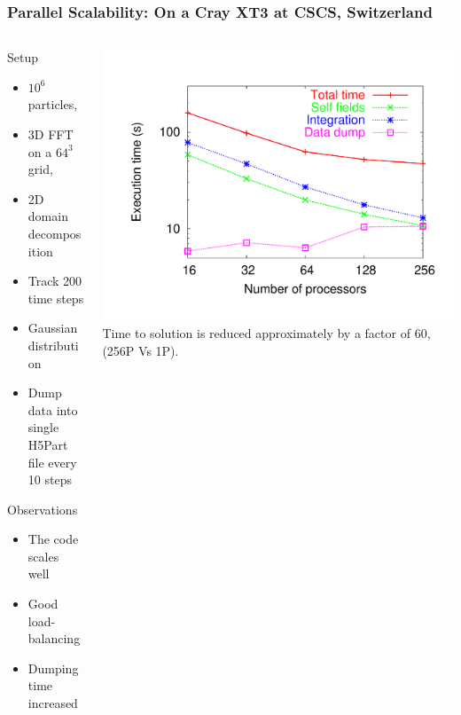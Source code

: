 \documentclass[xcolor=pdftex,table,10pt,yellow,mathserif]{beamer}
\begin{document}
\begin{frame} 
  \frametitle{Parallel Scalability: {On a Cray XT3 at CSCS, Switzerland}}
  \begin{columns}
    \begin{column}{4.cm}
      \scriptsize
      \begin{block}{Setup}
        \begin{itemize}
        \item  \alert{$10^6$} particles, 
        \item 3D FFT on a  \alert{$64^3$} grid,
	\item \alert{2D} domain decomposition
	\item Track  \alert{200} time steps
        \item Gaussian distribution
	\item Dump data into \alert{single} H5Part file every 10 steps
        \end{itemize}
      \end{block}
      
      \begin{block}{Observations}
        \begin{itemize}
        \item The code scales well
	\item Good load-balancing
	\item Dumping time increased 
        \end{itemize}
      \end{block}
    \end{column}
    \begin{column}{6.5cm}
    \begin{block}{}    
      \includegraphics[width=\linewidth]{figures/Timing64mesh}
      \center Time to solution is reduced approximately by a factor of \alert{60},(256P Vs 1P).
    \end{block}  
    \end{column}
  \end{columns}
\end{frame}
\end{document}
